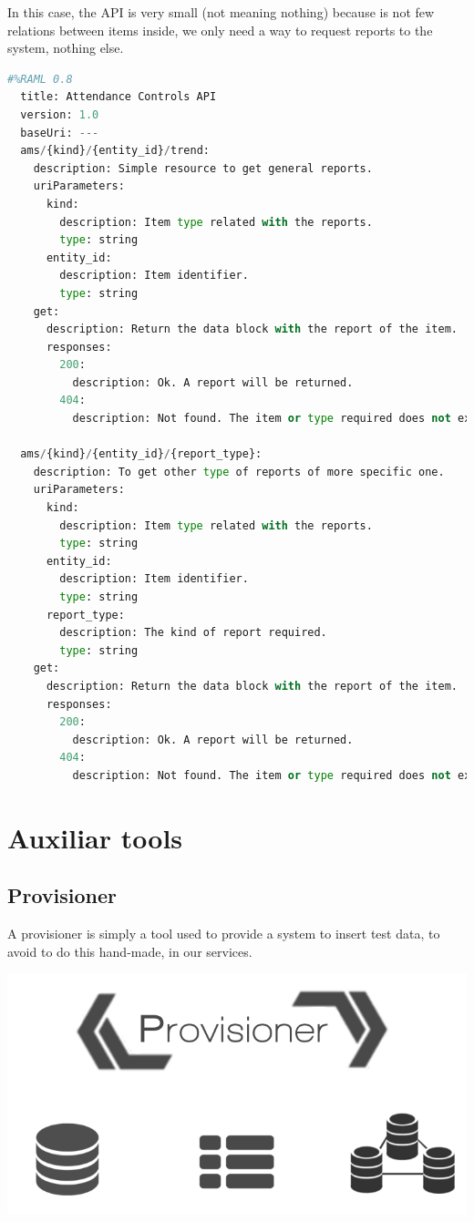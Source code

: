 In this case, the API is very small (not meaning nothing) because is not few
relations between items inside, we only need a way to request reports to the
system, nothing else.

\begin{lstlisting}[language=python,frame=none]
  #%RAML 0.8
  title: Attendance Controls API
  version: 1.0
  baseUri: ---
  ams/{kind}/{entity_id}/trend:
    description: Simple resource to get general reports.
    uriParameters:
      kind:
        description: Item type related with the reports.
        type: string
      entity_id:
        description: Item identifier.
        type: string
    get:
      description: Return the data block with the report of the item.
      responses:
        200:
          description: Ok. A report will be returned.
        404:
          description: Not found. The item or type required does not exists.

  ams/{kind}/{entity_id}/{report_type}:
    description: To get other type of reports of more specific one.
    uriParameters:
      kind:
        description: Item type related with the reports.
        type: string
      entity_id:
        description: Item identifier.
        type: string
      report_type:
        description: The kind of report required.
        type: string
    get:
      description: Return the data block with the report of the item.
      responses:
        200:
          description: Ok. A report will be returned.
        404:
          description: Not found. The item or type required does not exists.

\end{lstlisting}


\section{Auxiliar tools}

\subsection{Provisioner}
A provisioner is simply a tool used to provide a system to insert test data, to
avoid to do this hand-made, in our services.

\begin{center}
\includegraphics[scale=0.4]{img/graphics/provisioner.png}
\end{center}

